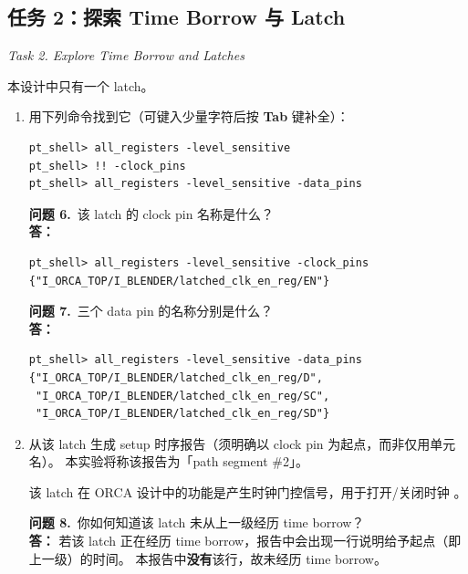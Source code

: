 \subsection{任务 2：探索 Time Borrow 与 Latch}
\label{lab5:task2}

\noindent\textit{Task 2. Explore Time Borrow and Latches}

本设计中只有一个 latch。

\begin{enumerate}
  \item 用下列命令找到它（可键入少量字符后按 \textbf{Tab} 键补全）：
\begin{lstlisting}
pt_shell> all_registers -level_sensitive
pt_shell> !! -clock_pins
pt_shell> all_registers -level_sensitive -data_pins
\end{lstlisting}

\begin{questionBox}
\textbf{问题 6.}\ 该 latch 的 clock pin 名称是什么？\\[0.35em]
\textbf{答：}\\
\begin{lstlisting}
pt_shell> all_registers -level_sensitive -clock_pins
{"I_ORCA_TOP/I_BLENDER/latched_clk_en_reg/EN"}
\end{lstlisting}

\textbf{问题 7.}\ 三个 data pin 的名称分别是什么？\\[0.35em]
\textbf{答：}\\
\begin{lstlisting}
pt_shell> all_registers -level_sensitive -data_pins
{"I_ORCA_TOP/I_BLENDER/latched_clk_en_reg/D",
 "I_ORCA_TOP/I_BLENDER/latched_clk_en_reg/SC",
 "I_ORCA_TOP/I_BLENDER/latched_clk_en_reg/SD"}
\end{lstlisting}
\end{questionBox}

  \item 从该 latch 生成 setup 时序报告（须明确以 clock pin 为起点，而非仅用单元名）。
        本实验将称该报告为「path segment \#2」。

\begin{noteBox}
该 latch 在 ORCA 设计中的功能是产生时钟门控信号，用于打开/关闭时钟 。
\end{noteBox}

\begin{questionBox}
\textbf{问题 8.}\ 你如何知道该 latch 未从上一级经历 time borrow？\\[0.35em]
\textbf{答：} 若该 latch 正在经历 time borrow，报告中会出现一行说明给予起点（即上一级）的时间。
本报告中\textbf{没有}该行，故未经历 time borrow。


\end{questionBox}
\end{enumerate}
